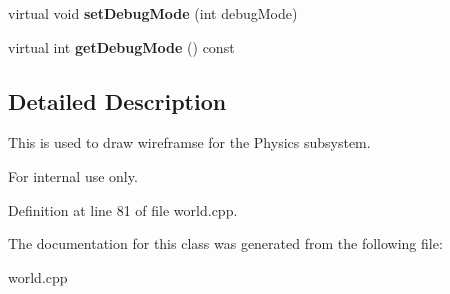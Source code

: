 \begin{DoxyCompactItemize}
\item 
\hypertarget{classphys_1_1debug_1_1InternalDebugDrawer_a63059b273ed6031a393b2d994b820bcc}{
virtual void {\bfseries setDebugMode} (int debugMode)}
\label{db/d27/classphys_1_1debug_1_1InternalDebugDrawer_a63059b273ed6031a393b2d994b820bcc}

\item 
\hypertarget{classphys_1_1debug_1_1InternalDebugDrawer_aba329861569d741e970ce5aafb668e84}{
virtual int {\bfseries getDebugMode} () const }
\label{db/d27/classphys_1_1debug_1_1InternalDebugDrawer_aba329861569d741e970ce5aafb668e84}

\end{DoxyCompactItemize}


\subsection{Detailed Description}
This is used to draw wireframse for the Physics subsystem. \begin{DoxyInternal}{For internal use only.}
\end{DoxyInternal}


Definition at line 81 of file world.cpp.



The documentation for this class was generated from the following file:\begin{DoxyCompactItemize}
\item 
world.cpp\end{DoxyCompactItemize}
